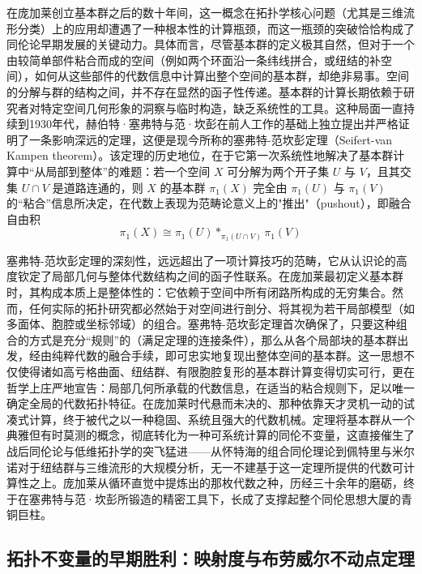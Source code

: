 \documentclass[12pt,a4paper]{article}
\begin{document}
在庞加莱创立基本群之后的数十年间，这一概念在拓扑学核心问题（尤其是三维流形分类）上的应用却遭遇了一种根本性的计算瓶颈，而这一瓶颈的突破恰恰构成了同伦论早期发展的关键动力。具体而言，尽管基本群的定义极其自然，但对于一个由较简单部件粘合而成的空间（例如两个环面沿一条纬线拼合，或纽结的补空间），如何从这些部件的代数信息中计算出整个空间的基本群，却绝非易事。空间的分解与群的结构之间，并不存在显然的函子性传递。基本群的计算长期依赖于研究者对特定空间几何形象的洞察与临时构造，缺乏系统性的工具。这种局面一直持续到1930年代，赫伯特·塞弗特与范·坎彭在前人工作的基础上独立提出并严格证明了一条影响深远的定理，这便是现今所称的塞弗特-范坎彭定理（Seifert-van Kampen theorem）。该定理的历史地位，在于它第一次系统性地解决了基本群计算中“从局部到整体”的难题：若一个空间 $X$ 可分解为两个开子集 $U$ 与 $V$，且其交集 $U \cap V$ 是道路连通的，则 $X$ 的基本群 $\pi_1(X)$ 完全由 $\pi_1(U)$ 与 $\pi_1(V)$ 的“粘合”信息所决定，在代数上表现为范畴论意义上的"推出"（pushout），即融合自由积
$$
\pi_1(X) \cong \pi_1(U) \ast_{\pi_1(U\cap V)} \pi_1(V)
$$

塞弗特-范坎彭定理的深刻性，远远超出了一项计算技巧的范畴，它从认识论的高度钦定了局部几何与整体代数结构之间的函子性联系。在庞加莱最初定义基本群时，其构成本质上是整体性的：它依赖于空间中所有闭路所构成的无穷集合。然而，任何实际的拓扑研究都必然始于对空间进行剖分、将其视为若干局部模型（如多面体、胞腔或坐标邻域）的组合。塞弗特-范坎彭定理首次确保了，只要这种组合的方式是充分“规则”的（满足定理的连接条件），那么从各个局部块的基本群出发，经由纯粹代数的融合手续，即可忠实地复现出整体空间的基本群。这一思想不仅使得诸如高亏格曲面、纽结群、有限胞腔复形的基本群计算变得切实可行，更在哲学上庄严地宣告：局部几何所承载的代数信息，在适当的粘合规则下，足以唯一确定全局的代数拓扑特征。在庞加莱时代悬而未决的、那种依靠天才灵机一动的试凑式计算，终于被代之以一种稳固、系统且强大的代数机械。定理将基本群从一个典雅但有时莫测的概念，彻底转化为一种可系统计算的同伦不变量，这直接催生了战后同伦论与低维拓扑学的突飞猛进——从怀特海的组合同伦理论到佩特里与米尔诺对于纽结群与三维流形的大规模分析，无一不建基于这一定理所提供的代数可计算性之上。庞加莱从循环直觉中提炼出的那枚代数之种，历经三十余年的磨砺，终于在塞弗特与范·坎彭所锻造的精密工具下，长成了支撑起整个同伦思想大厦的青铜巨柱。

\subsection{拓扑不变量的早期胜利：映射度与布劳威尔不动点定理}
\end{document}
